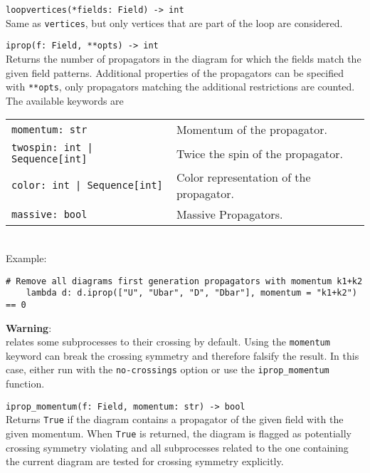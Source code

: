 \begin{basedescript}{\desclabelstyle{\pushlabel}}
   \item[\hspace{-1em}]\colorbox{gray!30}{\lstinline[style=py]|loopvertices(*fields: Field) -> int|} \vspace{0.1cm}\\
   Same as \texttt{vertices}, but only vertices that are part of the loop are considered.

   \item[\hspace{-1em}]\colorbox{gray!30}{\lstinline[style=py]|iprop(f: Field, **opts) -> int|} \vspace{0.1cm}\\
   Returns the number of propagators in the diagram for which the fields match the given field patterns. Additional properties of the propagators can be specified with \texttt{**opts}, only propagators matching the additional restrictions are counted. The available keywords are \\
   \def\arraystretch{1.5}
   \begin{tabular}{l l}
    \colorbox{gray!30}{\lstinline[style=py]|momentum: str|} & Momentum of the propagator. \\
    \colorbox{gray!30}{\lstinline[style=py]{twospin: int | Sequence[int]}} & Twice the spin of the propagator. \\
    \colorbox{gray!30}{\lstinline[style=py]{color: int | Sequence[int]}} & Color representation of the propagator. \\
    \colorbox{gray!30}{\lstinline[style=py]|massive: bool|} & Massive Propagators.
   \end{tabular}
   \def\arraystretch{1.0}
   \vspace{0.2cm} \\
   Example:
   \begin{lstlisting}[style=py]
    # Remove all diagrams first generation propagators with momentum k1+k2
    lambda d: d.iprop(["U", "Ubar", "D", "Dbar"], momentum = "k1+k2") == 0
   \end{lstlisting}
   \colorbox{red!15}{\parbox{\linewidth}{\textbf{Warning}: \vspace{0.1cm}\\ \gosam relates some subprocesses to their crossing by default. Using the \texttt{momentum} keyword can break the crossing symmetry and therefore falsify the result. In this case, either run \gosam with the \texttt{no-crossings} option or use the \lstinline[style=py]|iprop_momentum| function.}}

   \item[\hspace{-1em}]\colorbox{gray!30}{\lstinline[style=py]|iprop_momentum(f: Field, momentum: str) -> bool|} \vspace{0.1cm}\\
   Returns \texttt{True} if the diagram contains a propagator of the given field with the given momentum. When \texttt{True} is returned, the diagram is flagged as potentially crossing symmetry violating and all subprocesses related to the one containing the current diagram are tested for crossing symmetry explicitly.


\end{basedescript}
